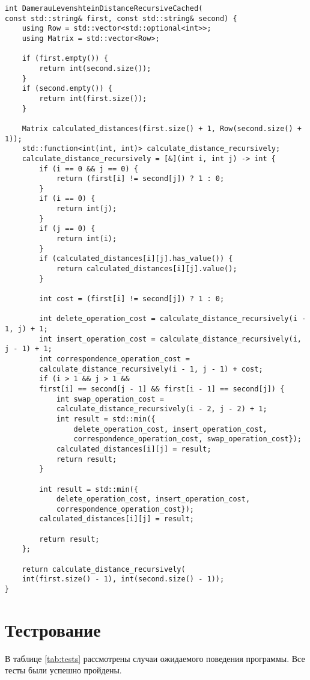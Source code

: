 \begin{lstlisting}[caption=Рекурсивный алгоритм Дамерау-Левенштейна с кешированием]
int DamerauLevenshteinDistanceRecursiveCached(
const std::string& first, const std::string& second) {
	using Row = std::vector<std::optional<int>>;
	using Matrix = std::vector<Row>;
	
	if (first.empty()) {
		return int(second.size());
	}
	if (second.empty()) {
		return int(first.size());
	}
	
	Matrix calculated_distances(first.size() + 1, Row(second.size() + 1));
	std::function<int(int, int)> calculate_distance_recursively;
	calculate_distance_recursively = [&](int i, int j) -> int {
		if (i == 0 && j == 0) {
			return (first[i] != second[j]) ? 1 : 0;
		}
		if (i == 0) {
			return int(j);
		}
		if (j == 0) {
			return int(i);
		}
		if (calculated_distances[i][j].has_value()) {
			return calculated_distances[i][j].value();
		}
		
		int cost = (first[i] != second[j]) ? 1 : 0;
		
		int delete_operation_cost = calculate_distance_recursively(i - 1, j) + 1;
		int insert_operation_cost = calculate_distance_recursively(i, j - 1) + 1;
		int correspondence_operation_cost =
		calculate_distance_recursively(i - 1, j - 1) + cost;
		if (i > 1 && j > 1 &&
		first[i] == second[j - 1] && first[i - 1] == second[j]) {
			int swap_operation_cost =
			calculate_distance_recursively(i - 2, j - 2) + 1;
			int result = std::min({
				delete_operation_cost, insert_operation_cost,
				correspondence_operation_cost, swap_operation_cost});
			calculated_distances[i][j] = result;
			return result;
		}
		
		int result = std::min({
			delete_operation_cost, insert_operation_cost,
			correspondence_operation_cost});
		calculated_distances[i][j] = result;
		
		return result;
	};
	
	return calculate_distance_recursively(
	int(first.size() - 1), int(second.size() - 1));
}
\end{lstlisting}


\section{Тестрование}



В таблице \ref{tab:tests} рассмотрены случаи ожидаемого поведения программы. Все тесты были успешно пройдены.

